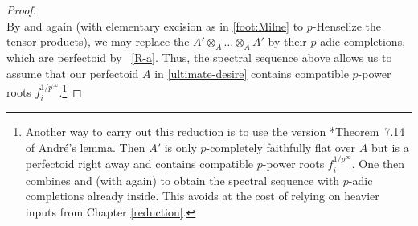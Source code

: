 \documentclass[11pt, reqno]{amsart}
\numberwithin{equation}{numberingbase}
\theoremstyle{thms}
\theoremstyle{claims}
\theoremstyle{defs}
\theoremstyle{thms}
\theoremstyle{defs}
\theoremstyle{subsection-tweak}
\theoremstyle{subsection-tweak}
\begin{document}
\begin{proof}
\[\]
By  and  again (with elementary excision as in \cref{foot:Milne} to $p$-Henselize the tensor products),  we may replace the $A'\otimes_A \ldots\otimes_A A'$ by their $p$-adic completions, which are perfectoid by ~\ref{R-a}. Thus, the spectral sequence above allows us to assume that our perfectoid $A$ in \eqref{ultimate-desire} contains compatible $p$-power roots $f_i^{1/p^\infty}$.\footnote{Another way to carry out this reduction is to use the version \cite{BS19}*{Theorem~7.14%
} of Andr\'{e}'s lemma. Then $A'$ is only $p$-completely faithfully flat over $A$ but is a perfectoid right away and contains compatible $p$-power roots $f_i^{1/p^\infty}$. One then combines  and  (with  again) to obtain the spectral sequence with $p$-adic completions already inside. This avoids  at the cost of relying on heavier inputs from Chapter \ref{reduction}.} %


\end{proof}
\end{document}
